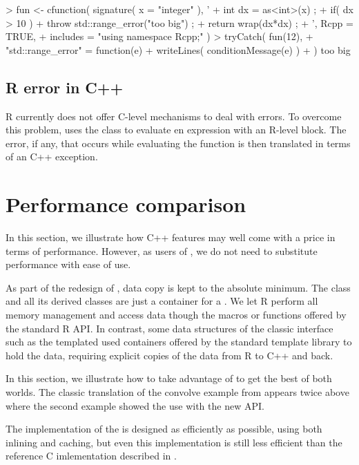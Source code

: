 \begin{example}
> fun <- cfunction( signature( x = "integer" ), '
+  int dx = as<int>(x) ;
+   if( dx > 10 ) 
+      throw std::range_error("too big") ;
+   return wrap(dx*dx) ;
+ ', Rcpp = TRUE, 
+  includes = "using namespace Rcpp;" )
> tryCatch( fun(12), 
+ "std::range_error" = function(e){
+    writeLines( conditionMessage(e) )
+ } )
too big
\end{example}

\subsection{R error in C++}

R currently does not offer C-level mechanisms to deal with errors. To 
overcome this problem,  uses the 
class to evaluate en expression with an R-level 
block. The error, if any, that occurs while evaluating the 
function is then translated in terms of an C++ exception. 

\section{Performance comparison}

In this section, we illustrate how C++ features may well come with a price
in terms of performance. However, as users of , we do not need to
substitute performance with ease of use.

As part of the redesign of , data copy is kept to the
absolute minimum. The  class and all its derived
classes are just a container for a . We let R perform
all memory management and access data though the macros or functions
offered by the standard R API. In contrast, some data structures
of the classic  interface such as the templated 
 used containers offered by the standard template
library to hold the data, requiring explicit copies of the data 
from R to C++ and back.

In this section, we illustrate how to take advantage of  to get
the best of both worlds. The classic  translation of the convolve example from
\cite{R:exts} appears twice above where the second example showed the use
with the new API.

The implementation of the  is designed as 
efficiently as possible, using both inlining and caching, 
but even this implementation is still less efficient than the 
reference C imlementation described in \cite{R:exts}.

